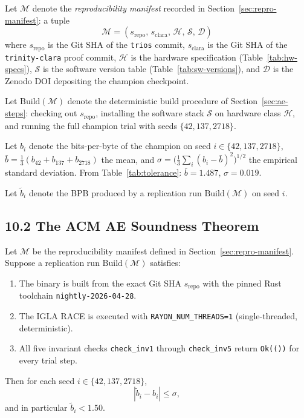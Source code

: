 Let $\mathcal{M}$ denote the \emph{reproducibility manifest} recorded in
Section~\ref{sec:repro-manifest}: a tuple
\[
  \mathcal{M} = (s_{\mathrm{repo}},\, s_{\mathrm{clara}},\,
                  \mathcal{H},\, \mathcal{S},\, \mathcal{D})
\]
where $s_{\mathrm{repo}}$ is the Git SHA of the \texttt{trios} commit,
$s_{\mathrm{clara}}$ is the Git SHA of the \texttt{trinity-clara} proof
commit, $\mathcal{H}$ is the hardware specification (Table~\ref{tab:hw-specs}),
$\mathcal{S}$ is the software version table (Table~\ref{tab:sw-versions}),
and $\mathcal{D}$ is the Zenodo DOI depositing the champion checkpoint.

Let $\mathrm{Build}(\mathcal{M})$ denote the deterministic build procedure
of Section~\ref{sec:ae-steps}: checking out $s_{\mathrm{repo}}$,
installing the software stack $\mathcal{S}$ on hardware class $\mathcal{H}$,
and running the full champion trial with seeds $\{42, 137, 2718\}$.

Let $b_i$ denote the bits-per-byte of the champion on seed $i \in
\{42, 137, 2718\}$, $\bar{b} = \frac{1}{3}(b_{42}+b_{137}+b_{2718})$ the
mean, and $\sigma = \bigl(\frac{1}{3}\sum_{i}(b_i - \bar{b})^2\bigr)^{1/2}$
the empirical standard deviation.  From Table~\ref{tab:tolerance}:
$\bar{b} = 1.487$, $\sigma = 0.019$.

Let $\tilde{b}_i$ denote the BPB produced by a replication run
$\mathrm{Build}(\mathcal{M})$ on seed $i$.

\subsection{10.2 The ACM AE Soundness Theorem}%
\label{sec:ae-thm}

\begin{theorem}\label{thm:ae-soundness}
Let $\mathcal{M}$ be the reproducibility manifest defined in
Section~\ref{sec:repro-manifest}.  Suppose a replication run
$\mathrm{Build}(\mathcal{M})$ satisfies:
\begin{enumerate}[label=\upshape(\Alph*)]
  \item\label{item:ae-A} The binary is built from the exact Git SHA
    $s_{\mathrm{repo}}$ with the pinned Rust toolchain
    \texttt{nightly-2026-04-28}.
  \item\label{item:ae-B} The IGLA RACE is executed with
    \texttt{RAYON\_NUM\_THREADS=1} (single-threaded, deterministic).
  \item\label{item:ae-C} All five invariant checks
    \texttt{check\_inv1} through \texttt{check\_inv5} return
    \texttt{Ok(())} for every trial step.
\end{enumerate}
Then for each seed $i \in \{42, 137, 2718\}$,
\[
  |\tilde{b}_i - b_i| \leq \sigma,
\]
and in particular $\tilde{b}_i < 1.50$.
\end{theorem}

